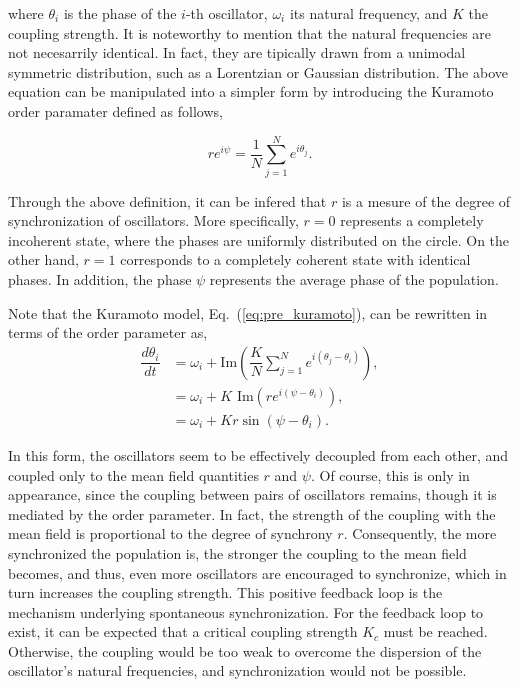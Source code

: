 \noindent where $\theta_i$ is the phase of the $i$-th oscillator, $\omega_i$ its natural frequency, and $K$ the coupling strength.
It is noteworthy to mention that the natural frequencies are not necesarrily identical. In fact, they
are tipically drawn from a unimodal symmetric distribution, such as a Lorentzian or Gaussian distribution.
The above equation can be manipulated into a simpler form by introducing the Kuramoto order paramater
defined as follows,

\begin{equation}
    r e^{i\psi} = \dfrac{1}{N} \sum_{j=1}^{N} e^{i\theta_j}.
    \label{eq:pre_kuramoto_order}
\end{equation}

Through the above definition, it can be infered that $r$ is a mesure of the degree of synchronization
of oscillators. More specifically, $r = 0$ represents a completely incoherent state, where the phases
are uniformly distributed on the circle. On the other hand, $r = 1$ corresponds to a completely coherent 
state with identical phases. In addition, the phase $\psi$ represents the average phase of the population.


Note that the Kuramoto model, Eq.~(\ref{eq:pre_kuramoto}), can be rewritten in terms of the order 
parameter as,
\begin{align}
    \dfrac{d\theta_i}{dt} &= \omega_i 
        + \text{Im} \left(\dfrac{K}{N}\sum_{j=1}^{N} e^{i(\theta_j-\theta_i)}\right), \nonumber \\
    &= \omega_i + K \text{ Im} \left(r e^{i(\psi - \theta_i)}\right), \nonumber \\
    &= \omega_i + K r \sin(\psi - \theta_i).
    \label{eq:pre_kuramoto_mean_field}
\end{align}

In this form, the oscillators seem to be effectively decoupled from each other, and coupled only to the
mean field quantities $r$ and $\psi$. Of course, this is only in appearance, since the
coupling between pairs of oscillators remains, though it is mediated by the order parameter. In fact,
the strength of the coupling with the mean field is proportional to the degree of synchrony $r$. 
Consequently, the more synchronized the population is, the stronger the coupling to the mean field becomes, and thus,
even more oscillators are encouraged to synchronize, which in turn increases the coupling strength.
This positive feedback loop is the mechanism underlying spontaneous synchronization. For the
feedback loop to exist, it can be expected that a critical coupling strength $K_c$
must be reached. Otherwise, the coupling would be too weak to overcome the dispersion of the
oscillator's natural frequencies, and synchronization would not be possible.

